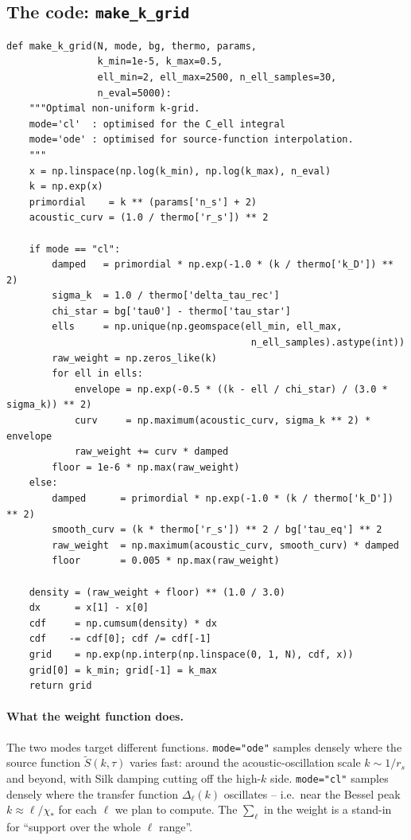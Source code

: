 \subsection{The code: \texttt{make\_k\_grid}}

\begin{codebox}
\begin{lstlisting}[style=python]
def make_k_grid(N, mode, bg, thermo, params,
                k_min=1e-5, k_max=0.5,
                ell_min=2, ell_max=2500, n_ell_samples=30,
                n_eval=5000):
    """Optimal non-uniform k-grid.
    mode='cl'  : optimised for the C_ell integral
    mode='ode' : optimised for source-function interpolation.
    """
    x = np.linspace(np.log(k_min), np.log(k_max), n_eval)
    k = np.exp(x)
    primordial    = k ** (params['n_s'] + 2)
    acoustic_curv = (1.0 / thermo['r_s']) ** 2

    if mode == "cl":
        damped   = primordial * np.exp(-1.0 * (k / thermo['k_D']) ** 2)
        sigma_k  = 1.0 / thermo['delta_tau_rec']
        chi_star = bg['tau0'] - thermo['tau_star']
        ells     = np.unique(np.geomspace(ell_min, ell_max,
                                           n_ell_samples).astype(int))
        raw_weight = np.zeros_like(k)
        for ell in ells:
            envelope = np.exp(-0.5 * ((k - ell / chi_star) / (3.0 * sigma_k)) ** 2)
            curv     = np.maximum(acoustic_curv, sigma_k ** 2) * envelope
            raw_weight += curv * damped
        floor = 1e-6 * np.max(raw_weight)
    else:
        damped      = primordial * np.exp(-1.0 * (k / thermo['k_D']) ** 2)
        smooth_curv = (k * thermo['r_s']) ** 2 / bg['tau_eq'] ** 2
        raw_weight  = np.maximum(acoustic_curv, smooth_curv) * damped
        floor       = 0.005 * np.max(raw_weight)

    density = (raw_weight + floor) ** (1.0 / 3.0)
    dx      = x[1] - x[0]
    cdf     = np.cumsum(density) * dx
    cdf    -= cdf[0]; cdf /= cdf[-1]
    grid    = np.exp(np.interp(np.linspace(0, 1, N), cdf, x))
    grid[0] = k_min; grid[-1] = k_max
    return grid
\end{lstlisting}
\end{codebox}

\paragraph{What the weight function does.}
The two modes target different functions. \texttt{mode="ode"} samples densely where the source function $\widetilde S(k, \tau)$ varies fast: around the acoustic-oscillation scale $k \sim 1/r_s$ and beyond, with Silk damping cutting off the high-$k$ side. \texttt{mode="cl"} samples densely where the transfer function $\Delta_\ell(k)$ oscillates -- i.e.\ near the Bessel peak $k \approx \ell/\chi_*$ for each $\ell$ we plan to compute. The $\sum_\ell$ in the weight is a stand-in for ``support over the whole $\ell$ range''.

